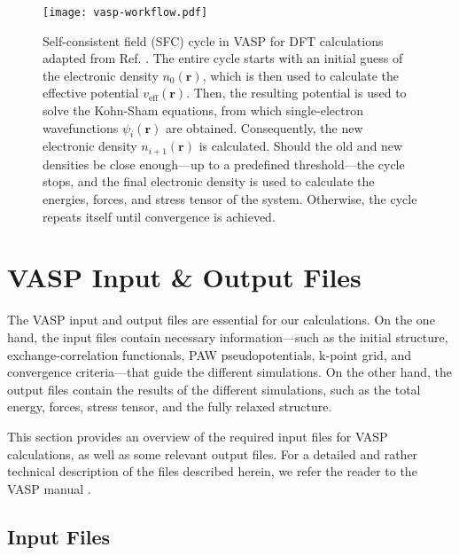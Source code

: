 \begin{figure}[h]
    \centering
    \texttt{[image: vasp-workflow.pdf]}
    \caption{
        Self-consistent field (SFC) cycle in VASP for DFT calculations adapted from Ref. \cite{sholl2023density}. The entire cycle starts with an initial guess of the electronic density $n_0(\mathbf{r})$, which is then used to calculate the effective potential $v_{\text{eff}}(\mathbf{r})$. Then, the resulting potential is used to solve the Kohn-Sham equations, from which single-electron wavefunctions $\psi_i(\mathbf{r})$ are obtained. Consequently, the new electronic density $n_{i+1}(\mathbf{r})$ is calculated. Should the old and new densities be close enough---up to a predefined threshold---the cycle stops, and the final electronic density is used to calculate the energies, forces, and stress tensor of the system. Otherwise, the cycle repeats itself until convergence is achieved. 
    }
    \label{fig:vasp_workflow}
\end{figure}

\section{VASP Input \& Output Files}
\label{sec:vasp-input-output-files}
The VASP input and output files are essential for our calculations. On the one hand, the input files contain necessary information---such as the initial structure, exchange-correlation functionals, PAW pseudopotentials, k-point grid, and convergence criteria---that guide the different simulations. On the other hand, the output files contain the results of the different simulations, such as the total energy, forces, stress tensor, and the fully relaxed structure.

This section provides an overview of the required input files for VASP calculations, as well as some relevant output files. For a detailed and rather technical description of the files described herein, we refer the reader to the VASP manual \cite{zotero-item-672}.

\subsection{Input Files}
